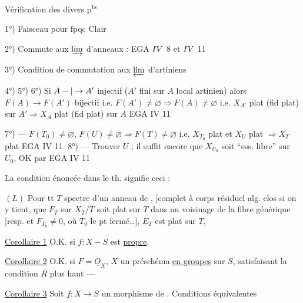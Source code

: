Vérification des divers p\textsuperscript{ts}

1°) Faisceau pour fpqc Clair

2°) Commute aux $\varinjlim$ d'anneaux : EGA $IV$ 8 et $IV$ 11

3°) Condition de commutation aux $\varprojlim$ d'artiniens

4°) 5°) 6°) Si $A-|\to A'$ injectif ($A'$ fini sur $A$ local artinien) alors $F(A)\longrightarrow F(A')$ bijectif i.e. $F(A')\ne\varnothing\Rightarrow F(A)\ne\varnothing$ i.e. $X_{A'}$ plat (fid plat) sur $A'\Rightarrow X_A$ plat (fid plat) sur $A$ EGA IV 11

7°) --- $F(T_0)\ne\varnothing$, $F(U)\ne\varnothing\Rightarrow F(T)\ne\varnothing$ i.e. $X_{T_0}$ plat et $X_U$ plat $\Rightarrow X_T$ plat EGA IV 11.
8°) --- Trouver $U$ ; il suffit encore que $X_{U_0}$ soit ``ess. libre'' sur $U_0$, OK par EGA IV 11

La condition énoncée dans le th. signifie ceci :

$(L)$ Pour tt $T$ spectre d'un anneau de  , [complet à corps résiduel alg. clos si on y tient,   que $F_T$ sur $X_T/T$ soit plat sur $T$ dans un voisinage de la fibre générique [resp. et $F_{T_0}\ne0$, où $T_0$ le pt fermé\ldots],  $E_T$ est plat sur $T$, 

\uline{Corollaire 1} O.K. si $f:X-S$ est \uline{propre}.

\uline{Corollaire 2} O.K. si  $F=\underline{O}_X$, $X$ un préschéma \uline{en groupes} sur $S$, satisfaisant la condition $R$ plus haut ---

\uline{Corollaire 3} Soit $f:X\longrightarrow S$ un morphisme de  . Conditions équivalentes

